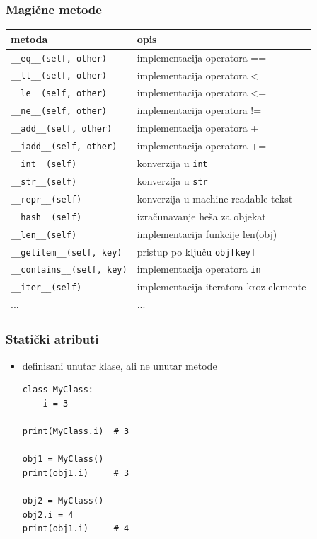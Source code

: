 \documentclass[compress]{beamer}
\begin{document}
\begin{frame}[fragile]
  \frametitle{Magične metode}
\small
\begin{center}
\begin{tabular}{ll}
\textbf{metoda} & \textbf{opis} \\ \hline
\texttt{\_\_eq\_\_(self, other)} & implementacija operatora == \\
\texttt{\_\_lt\_\_(self, other)} & implementacija operatora < \\
\texttt{\_\_le\_\_(self, other)} & implementacija operatora <= \\
\texttt{\_\_ne\_\_(self, other)} & implementacija operatora != \\
\texttt{\_\_add\_\_(self, other)} & implementacija operatora + \\
\texttt{\_\_iadd\_\_(self, other)} & implementacija operatora += \\
\texttt{\_\_int\_\_(self)} & konverzija u \texttt{int} \\
\texttt{\_\_str\_\_(self)} & konverzija u \texttt{str} \\
\texttt{\_\_repr\_\_(self)} & konverzija u machine-readable tekst \\
\texttt{\_\_hash\_\_(self)} & izračunavanje heša za objekat \\
\texttt{\_\_len\_\_(self)} & implementacija funkcije len(obj) \\
\texttt{\_\_getitem\_\_(self, key)} & pristup po ključu \texttt{obj[key]} \\
\texttt{\_\_contains\_\_(self, key)} & implementacija operatora \texttt{in} \\
\texttt{\_\_iter\_\_(self)} & implementacija iteratora kroz elemente \\
... & ...
\end{tabular}
\end{center}
\end{frame}

\begin{frame}[fragile]
\frametitle{Statički atributi}
\begin{itemize}
  \item definisani unutar klase, ali ne unutar metode
\begin{verbatim}
class MyClass:
    i = 3

print(MyClass.i)  # 3

obj1 = MyClass()
print(obj1.i)     # 3

obj2 = MyClass()
obj2.i = 4
print(obj1.i)     # 4
\end{verbatim}
\end{itemize}
\end{frame}
\end{document}
